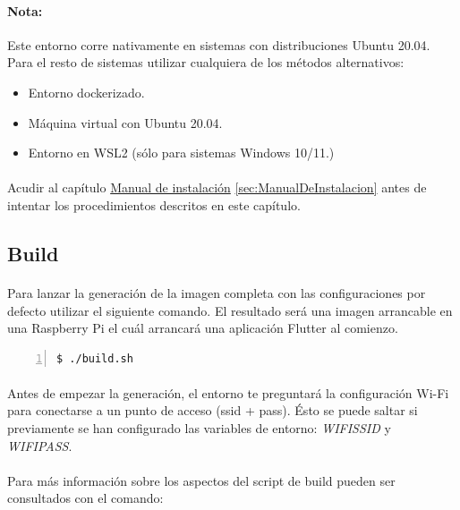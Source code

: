 \paragraph{Nota:} Este entorno corre nativamente en sistemas con distribuciones Ubuntu 20.04.
Para el resto de sistemas utilizar cualquiera de los métodos alternativos:

\begin{itemize}
    \item Entorno dockerizado.
    \item Máquina virtual con Ubuntu 20.04.
    \item Entorno en WSL2 (sólo para sistemas Windows 10/11.)
\end{itemize}

\paragraph{}Acudir al capítulo \hyperref[sec:ManualDeInstalacion]{Manual de instalación}
\ref{sec:ManualDeInstalacion} antes de intentar los procedimientos descritos en este
capítulo.

\subsection{Build}

\paragraph{}Para lanzar la generación de la imagen completa con las configuraciones por
defecto utilizar el siguiente comando. El resultado será una imagen arrancable en una
Raspberry Pi el cuál arrancará una aplicación Flutter al comienzo.

\begin{lstlisting}[style=consola, numbers=left]
    $ ./build.sh
\end{lstlisting}

\paragraph{}Antes de empezar la generación, el entorno te preguntará la configuración
Wi-Fi para conectarse a un punto de acceso (ssid + pass). Ésto se puede saltar si
previamente se han configurado las variables de entorno: \emph{WIFISSID} y \emph{WIFIPASS}.

\paragraph{}Para más información sobre los aspectos del script de build pueden ser
consultados con el comando:

